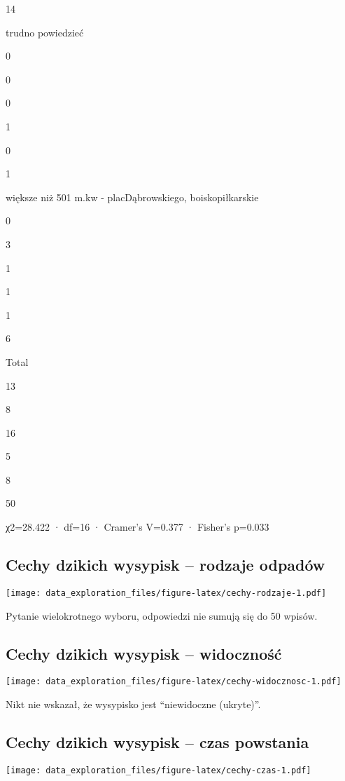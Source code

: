 \documentclass[
]{article}
\begin{document}
{14}

trudno powiedzieć

{0}

{0}

{0}

{1}

{0}

{1}

większe niż 501 m.kw - placDąbrowskiego, boiskopiłkarskie

{0}

{3}

{1}

{1}

{1}

{6}

Total

{13}

{8}

{16}

{5}

{8}

{50}

χ2=28.422 · df=16 · Cramer's V=0.377 · Fisher's p=0.033

\hypertarget{cechy-dzikich-wysypisk-rodzaje-odpaduxf3w}{%
\subsection{Cechy dzikich wysypisk -- rodzaje
odpadów}\label{cechy-dzikich-wysypisk-rodzaje-odpaduxf3w}}

\texttt{[image: data\_exploration\_files/figure-latex/cechy-rodzaje-1.pdf]}

Pytanie wielokrotnego wyboru, odpowiedzi nie sumują się do 50 wpisów.

\hypertarget{cechy-dzikich-wysypisk-widocznoux15bux107}{%
\subsection{Cechy dzikich wysypisk --
widoczność}\label{cechy-dzikich-wysypisk-widocznoux15bux107}}

\texttt{[image: data\_exploration\_files/figure-latex/cechy-widocznosc-1.pdf]}

Nikt nie wskazał, że wysypisko jest ``niewidoczne (ukryte)''.

\hypertarget{cechy-dzikich-wysypisk-czas-powstania}{%
\subsection{Cechy dzikich wysypisk -- czas
powstania}\label{cechy-dzikich-wysypisk-czas-powstania}}

\texttt{[image: data\_exploration\_files/figure-latex/cechy-czas-1.pdf]}
\end{document}
